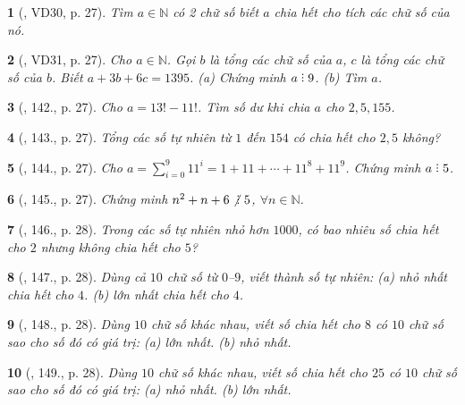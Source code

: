 \documentclass{article}
\newtheorem{baitoan}{}
\DeclareRobustCommand{\divby}{%
	\mathrel{\vbox{\baselineskip.65ex\lineskiplimit0pt\hbox{.}\hbox{.}\hbox{.}}}%
}
\begin{document}
\begin{baitoan}[\cite{Binh_Toan_6_tap_1}, VD30, p. 27]
	Tìm $a\in\mathbb{N}$ có 2 chữ số biết $a$ chia hết cho tích các chữ số của nó.
\end{baitoan}

\begin{baitoan}[\cite{Binh_Toan_6_tap_1}, VD31, p. 27]
	Cho $a\in\mathbb{N}$. Gọi $b$ là tổng các chữ số của $a$, $c$ là tổng các chữ số của $b$. Biết $a + 3b + 6c = 1395$. (a) Chứng minh $a\divby9$. (b) Tìm $a$.
\end{baitoan}

\begin{baitoan}[\cite{Binh_Toan_6_tap_1}, 142., p. 27]
	Cho $a = 13! - 11!$. Tìm số dư khi chia $a$ cho $2,5,155$.
\end{baitoan}

\begin{baitoan}[\cite{Binh_Toan_6_tap_1}, 143., p. 27]
	Tổng các số tự nhiên từ $1$ đến $154$ có chia hết cho $2,5$ không?
\end{baitoan}

\begin{baitoan}[\cite{Binh_Toan_6_tap_1}, 144., p. 27]
	Cho $a = \sum_{i=0}^9 11^i = 1 + 11 + \cdots + 11^8 + 11^9$. Chứng minh $a\divby5$.
\end{baitoan}

\begin{baitoan}[\cite{Binh_Toan_6_tap_1}, 145., p. 27]
	Chứng minh $n^2 + n + 6\not{\divby}\ 5$, $\forall n\in\mathbb{N}$.
\end{baitoan}

\begin{baitoan}[\cite{Binh_Toan_6_tap_1}, 146., p. 28]
	Trong các số tự nhiên nhỏ hơn $1000$, có bao nhiêu số chia hết cho $2$ nhưng không chia hết cho $5$?
\end{baitoan}

\begin{baitoan}[\cite{Binh_Toan_6_tap_1}, 147., p. 28]
	Dùng cả $10$ chữ số từ $0$--$9$, viết thành số tự nhiên: (a) nhỏ nhất chia hết cho $4$. (b) lớn nhất chia hết cho $4$.
\end{baitoan}

\begin{baitoan}[\cite{Binh_Toan_6_tap_1}, 148., p. 28]
	Dùng $10$ chữ số khác nhau, viết số chia hết cho $8$ có $10$ chữ số sao cho số đó có giá trị: (a) lớn nhất. (b) nhỏ nhất.
\end{baitoan}

\begin{baitoan}[\cite{Binh_Toan_6_tap_1}, 149., p. 28]
	Dùng $10$ chữ số khác nhau, viết số chia hết cho $25$ có $10$ chữ số sao cho số đó có giá trị: (a) nhỏ nhất. (b) lớn nhất.
\end{baitoan}
\end{document}
